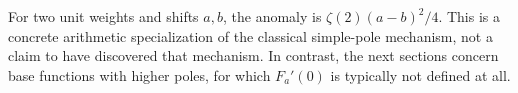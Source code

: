 For two unit weights and shifts $a,b$, the anomaly is
$\zeta(2)(a-b)^2/4$. This is a concrete arithmetic specialization of the
classical simple-pole mechanism, not a claim to have discovered that
mechanism. In contrast, the next sections concern base functions with
higher poles, for which $F_a'(0)$ is typically not defined at all.
